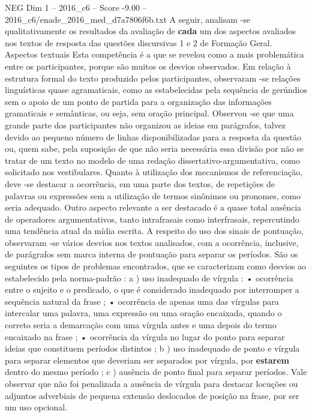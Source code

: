 \begin{textsample}{NEG Dim 1 – 2016\_c6 – Score -9.00 – 2016\_c6/enade\_2016\_med\_d7a7806f6b.txt}
A seguir, analisam -se qualitativamente os resultados da avaliação de \textbf{cada} um dos aspectos avaliados nos textos de resposta das questões discursivas 1 e 2 de Formação Geral.
Aspectos textuais Esta competência é a que se revelou como a mais problemática entre os participantes, porque são muitos os desvios observados.
Em relação à estrutura formal do texto produzido pelos participantes, observaram -se relações linguísticas quase agramaticais, como as estabelecidas pela sequência de gerúndios sem o apoio de um ponto de partida para a organização das informações gramaticais e semânticas, ou seja, sem oração principal.
Observou -se que uma grande parte dos participantes não organizou as ideias em parágrafos, talvez devido ao pequeno número de linhas disponibilizadas para a resposta da questão ou, quem sabe, pela suposição de que não seria necessária essa divisão por não se tratar de um texto no modelo de uma redação dissertativo-argumentativa, como solicitado nos vestibulares.
Quanto à utilização dos mecanismos de referenciação, deve -se destacar a ocorrência, em uma parte dos textos, de repetições de palavras ou expressões sem a utilização de termos sinônimos ou pronomes, como seria adequado.
Outro aspecto relevante a ser destacado é a quase total ausência de operadores argumentativos, tanto intrafrasais como interfrasais, repercutindo uma tendência atual da mídia escrita.
A respeito do uso dos sinais de pontuação, observaram -se vários desvios nos textos analisados, com a ocorrência, inclusive, de parágrafos sem marca interna de pontuação para separar os períodos.
São os seguintes os tipos de problemas encontrados, que se caracterizam como desvios ao estabelecido pela norma-padrão : a ) uso inadequado de vírgula : • ocorrência entre o sujeito e o predicado, o que é considerado inadequado por interromper a sequência natural da frase ; • ocorrência de apenas uma das vírgulas para intercalar uma palavra, uma expressão ou uma oração encaixada, quando o correto seria a demarcação com uma vírgula antes e uma depois do termo encaixado na frase ; • ocorrência da vírgula no lugar do ponto para separar ideias que constituem períodos distintos ; b ) uso inadequado de ponto e vírgula para separar elementos que deveriam ser separados por vírgula, por \textbf{estarem} dentro do mesmo período ; c ) ausência de ponto final para separar períodos.
Vale observar que não foi penalizada a ausência de vírgula para destacar locuções ou adjuntos adverbiais de pequena extensão deslocados de posição na frase, por ser um uso opcional.

\end{textsample}
